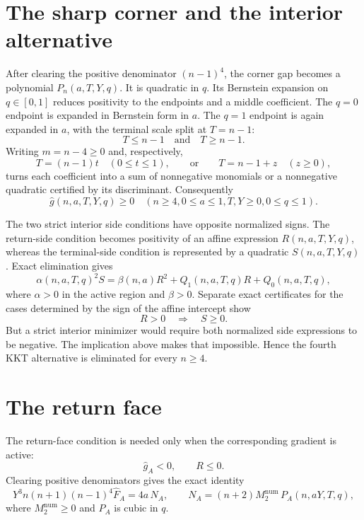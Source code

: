 \documentclass[11pt]{article}
\begin{document}
\section{The sharp corner and the interior alternative}

After clearing the positive denominator $(n-1)^4$, the corner gap becomes a
polynomial $P_n(a,T,Y,q)$.  It is quadratic in $q$.  Its Bernstein expansion
on $q\in[0,1]$ reduces positivity to the endpoints and a middle coefficient.
The $q=0$ endpoint is expanded in Bernstein form in $a$.  The $q=1$ endpoint
is again expanded in $a$, with the terminal scale split at $T=n-1$:
\[
 T\le n-1 \quad\text{and}\quad T\ge n-1.
\]
Writing $m=n-4\ge0$ and, respectively,
\[
 T=(n-1)t\quad(0\le t\le1),
 \qquad\text{or}\qquad T=n-1+z\quad(z\ge0),
\]
turns each coefficient into a sum of nonnegative monomials or a nonnegative
quadratic certified by its discriminant.  Consequently
\begin{equation}\label{eq:corner}
 \widehat g(n,a,T,Y,q)\ge0
 \quad(n\ge4, 0\le a\le1, T,Y\ge0, 0\le q\le1).
\end{equation}

The two strict interior side conditions have opposite normalized signs.  The
return-side condition becomes positivity of an affine expression
$R(n,a,T,Y,q)$, whereas the terminal-side condition is represented by a
quadratic $S(n,a,T,Y,q)$.  Exact elimination gives
\begin{equation}\label{eq:elimination}
 \alpha(n,a,T,q)^2 S
 =\beta(n,a)R^2+Q_1(n,a,T,q)R+Q_0(n,a,T,q),
\end{equation}
where $\alpha>0$ in the active region and $\beta>0$.  Separate exact
certificates for the cases determined by the sign of the affine intercept
show
\[
 R>0\quad\Longrightarrow\quad S\ge0.
\]
But a strict interior minimizer would require both normalized side
expressions to be negative.  The implication above makes that impossible.
Hence the fourth KKT alternative is eliminated for every $n\ge4$.

\section{The return face}

The return-face condition is needed only when the corresponding gradient is
active:
\[
 \widehat g_A<0,\qquad R\le0.
\]
Clearing positive denominators gives the exact identity
\begin{equation}\label{eq:return-num}
 Y^3n(n+1)(n-1)^4\widehat F_A
   =4a\,N_A,
 \qquad
 N_A=(n+2)M_2^{\mathrm{num}}\,P_A(n,aY,T,q),
\end{equation}
where $M_2^{\mathrm{num}}\ge0$ and $P_A$ is cubic in $q$.
\end{document}
